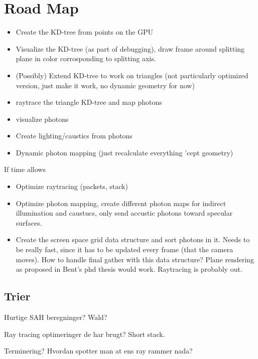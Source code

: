 \section*{Road Map}

\begin{itemize}
\item Create the KD-tree from points on the GPU
\item Visualize the KD-tree (as part of debugging), draw frame around
  splitting plane in color corrosponding to splitting axis.
\item (Possibly) Extend KD-tree to work on triangles (not particularly optimized
  version, just make it work, no dynamic geometry for now)
\item raytrace the triangle KD-tree and map photons
\item visualize photons
\item Create lighting/caustics from photons
\item Dynamic photon mapping (just recalculate everything 'cept geometry)
\end{itemize}

If time allows

\begin{itemize}
\item Optimize raytracing (packets, stack)
\item Optimize photon mapping, create different photon maps for
  indirect illumination and caustucs, only send accustic photons
  toward specular surfaces.
\item Create the screen space grid data structure and sort photons in
  it. Needs to be really fast, since it has to be updated every frame
  (that the camera moves). How to handle final gather with this data
  structure? Plane rendering as proposed in Bent's phd thesis would
  work. Raytracing is probably out.
\end{itemize}



\subsection*{Trier}


Hurtige SAH beregninger? Wald?

Ray tracing optimeringer de har brugt? Short stack.

Terminering? Hvordan spotter man at ens ray rammer nada?


